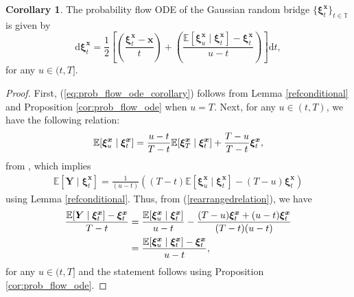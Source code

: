\documentclass{article}
\theoremstyle{definition}
\newtheorem{corollary}[proposition]{Corollary}
\begin{document}
\begin{corollary} \label{coro:prob_flow_ode}
    The probability flow ODE of the Gaussian random bridge $\{\boldsymbol{\xi}^{\boldsymbol{x}}_t\}_{t \in \mathbb{T}}$ is given by
    \begin{equation} \label{eq:prob_flow_ode_corollary}
        \mathrm{d}\boldsymbol{\xi}^{\boldsymbol{x}}_t = \frac{1}{2} \left[ \left( \frac{\boldsymbol{\xi}^{\boldsymbol{x}}_t - \boldsymbol{x}}{t} \right) +  \left( \frac{\mathbb{E}[\boldsymbol{\xi}^{\boldsymbol{x}}_u \mid \boldsymbol{\xi}^{\boldsymbol{x}}_t] - \boldsymbol{\xi}^{\boldsymbol{x}}_t}{u-t} \right) \right] \mathrm{d}t,
    \end{equation}
	for any $u\in(t,T]$.
\end{corollary}
\begin{proof}
First, (\ref{eq:prob_flow_ode_corollary}) follows from Lemma \ref{refconditional} and Proposition \ref{cor:prob_flow_ode} when $u=T$. Next, for any $u\in(t,T)$, we have the following relation:
\begin{align}
\mathbb{E}[\boldsymbol{\xi}^{\boldsymbol{x}}_u \mid \boldsymbol{\xi}^{\boldsymbol{x}}_t] = \frac{u-t}{T-t}\mathbb{E}[\boldsymbol{\xi}^{\boldsymbol{x}}_T \mid \boldsymbol{\xi}^{\boldsymbol{x}}_t] + \frac{T-u}{T-t} \boldsymbol{\xi}^{\boldsymbol{x}}_t, \notag
\end{align}
from \cite{hoylehughstonmacrina_2011}, which implies
\begin{align}
\mathbb{E}[\boldsymbol{Y} \mid \boldsymbol{\xi}^{\boldsymbol{x}}_t] = \frac{1}{(u-t)}\left((T-t)\mathbb{E}[\boldsymbol{\xi}^{\boldsymbol{x}}_u \mid \boldsymbol{\xi}^{\boldsymbol{x}}_t] - (T-u)\boldsymbol{\xi}^{\boldsymbol{x}}_t\right) \label{rearrangedrelation}
\end{align}
using Lemma \ref{refconditional}. Thus, from (\ref{rearrangedrelation}), we have
\begin{align}
\frac{\mathbb{E}[\boldsymbol{Y} \mid \boldsymbol{\xi}^{\boldsymbol{x}}_t] - \boldsymbol{\xi}^{\boldsymbol{x}}_t}{T-t} &= \frac{\mathbb{E}[\boldsymbol{\xi}^{\boldsymbol{x}}_u \mid \boldsymbol{\xi}^{\boldsymbol{x}}_t]}{u-t} - \frac{(T-u) \boldsymbol{\xi}^{\boldsymbol{x}}_t + (u-t)\boldsymbol{\xi}^{\boldsymbol{x}}_t}{(T-t)(u-t)} \notag \\
&= \frac{\mathbb{E}[\boldsymbol{\xi}^{\boldsymbol{x}}_u \mid \boldsymbol{\xi}^{\boldsymbol{x}}_t] - \boldsymbol{\xi}^{\boldsymbol{x}}_t}{u-t}, \notag
\end{align}
for any $u\in(t,T]$ and the statement follows using Proposition \ref{cor:prob_flow_ode}.
\end{proof}
\end{document}
